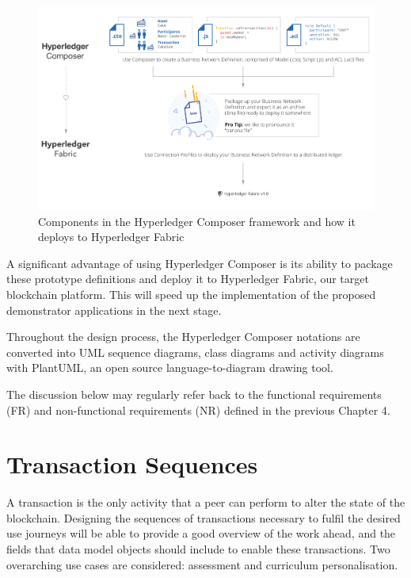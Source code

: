 \begin{figure}[!ht] 
    \centering    
    \includegraphics[width=1.0\textwidth]{composer2fabric}
    \caption[Hyperledger Composer]
        {Components in the Hyperledger Composer framework and how it deploys to 
        Hyperledger Fabric \citep{cuicapuza2017composer}} 
    \label{fig:composer2fabric}
\end{figure}

A significant advantage of using Hyperledger Composer is its ability to package these 
prototype definitions and deploy it to Hyperledger Fabric, our target blockchain platform. 
This will speed up the implementation of the proposed demonstrator applications 
in the next stage.

Throughout the design process, the Hyperledger Composer notations are converted into UML sequence 
diagrams, class diagrams and activity diagrams with PlantUML, an open source language-to-diagram drawing tool.

The discussion below may regularly refer back to the functional requirements (FR) and 
non-functional requirements (NR) defined in the previous Chapter 4.

\section{Transaction Sequences}

A transaction is the only activity that a peer can perform to alter the state of the blockchain. 
Designing the sequences of transactions necessary to fulfil the desired use journeys will  
be able to provide a good overview of the work ahead, and the fields that data model 
objects should include to enable these transactions. Two overarching use cases are considered: 
assessment and curriculum personalisation.

